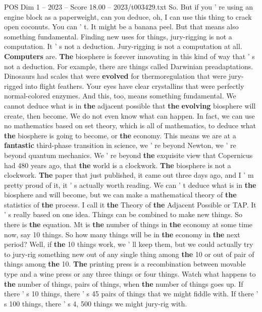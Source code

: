 \begin{textsample}{POS Dim 1 – 2023 – Score 18.00 – 2023/t003429.txt}
So.
But if you ' re using an engine block as a paperweight, can you deduce, oh, I can use this thing to crack open coconuts.
You can ' t.
It might be a banana peel.
But that means also something fundamental.
Finding new uses for things, jury-rigging is not a computation.
It ' s not a deduction.
Jury-rigging is not a computation at all. \textbf{Computers} are. \textbf{The} biosphere is forever innovating in this kind of way that ' s not a deduction.
For example, there are things called Darwinian preadaptations.
Dinosaurs had scales that were \textbf{evolved} for thermoregulation that were jury-rigged into flight feathers.
Your eyes have clear crystallins that were perfectly normal-colored enzymes.
And this, too, means something fundamental.
We cannot deduce what is in \textbf{the} adjacent possible that \textbf{the} \textbf{evolving} biosphere will create, then become.
We do not even know what can happen.
In fact, we can use no mathematics based on set theory, which is all of mathematics, to deduce what \textbf{the} biosphere is going to become, or \textbf{the} economy.
This means we are at a \textbf{fantastic} third-phase transition in science, we ' re beyond Newton, we ' re beyond quantum mechanics.
We ' re beyond \textbf{the} exquisite view that Copernicus had 480 years ago, that \textbf{the} world is a clockwork. \textbf{The} biosphere is not a clockwork. \textbf{The} paper that just published, it came out three days ago, and I ' m pretty proud of it, it ' s actually worth reading.
We can ' t deduce what is in \textbf{the} biosphere and will become, but we can make a mathematical theory of \textbf{the} statistics of \textbf{the} process.
I call it \textbf{the} Theory of \textbf{the} Adjacent Possible or TAP.
It ' s really based on one idea.
Things can be combined to make new things.
So there is \textbf{the} equation.
Mt is \textbf{the} number of things in \textbf{the} economy at some time now, say 10 things.
So how many things will be in \textbf{the} economy in \textbf{the} next period?
Well, if \textbf{the} 10 things work, we ' ll keep them, but we could actually try to jury-rig something new out of any single thing among \textbf{the} 10 or out of pair of things among \textbf{the} 10. \textbf{The} printing press is a recombination between movable type and a wine press or any three things or four things.
Watch what happens to \textbf{the} number of things, pairs of things, when \textbf{the} number of things goes up.
If there ' s 10 things, there ' s 45 pairs of things that we might fiddle with.
If there ' s 100 things, there ' s 4, 500 things we might jury-rig with.

\end{textsample}
